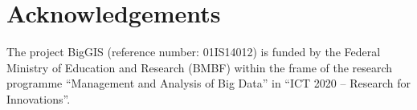 \documentclass{sig-alternate-05-2015}
\begin{document}

\section{Acknowledgements}
\label{sec:ack}
The project BigGIS (reference number: 01IS14012) is funded by the Federal
Ministry of Education and Research (BMBF) within the frame of the research
programme ``Management and Analysis of Big Data'' in ``ICT 2020 --
Research for Innovations''.

%

%
%
\end{document}
